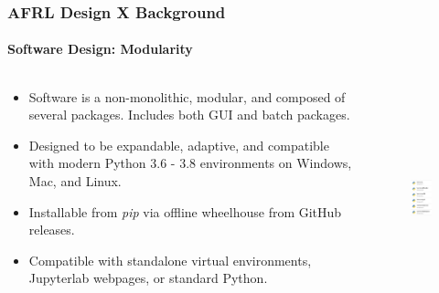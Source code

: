\documentclass[t]{beamer}
\begin{document}
\begin{frame}
  \frametitle{AFRL Design X Background}
  \framesubtitle{Software Design: Modularity}

  \vspace{-5mm}
  \begin{columns}

    \begin{column}{0.6\textwidth}
      \begin{itemize}
      \item Software is a non-monolithic, modular, and composed of several packages.  Includes both GUI and batch packages.
      \item Designed to be expandable, adaptive, and compatible with modern Python 3.6 - 3.8 environments on Windows, Mac, and Linux.
      \item Installable from \textit{pip} via offline wheelhouse from GitHub releases.
      \item Compatible with standalone virtual environments, Jupyterlab webpages, or standard Python.
      \end{itemize}
    \end{column}

    \begin{column}{0.4\textwidth}
      \vspace{-1.0mm}
      \begin{figure}
        \includegraphics[height=2.5in]{./figures/packages_azure_light.png}
      \end{figure}
    \end{column}

\end{columns}


\end{frame}




\lastframe
    
\end{document}
